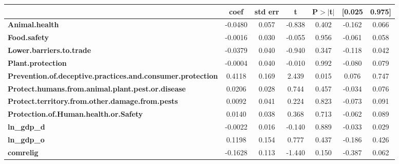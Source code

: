 \begin{center}
\begin{tabular}{lcccccc}
                                                                   & \textbf{coef} & \textbf{std err} & \textbf{t} & \textbf{P$> |$t$|$} & \textbf{[0.025} & \textbf{0.975]}  \\
\midrule
\textbf{Animal.health}                                             &      -0.0480  &        0.057     &    -0.838  &         0.402        &       -0.162    &        0.066     \\
\textbf{Food.safety}                                               &      -0.0016  &        0.030     &    -0.055  &         0.956        &       -0.061    &        0.058     \\
\textbf{Lower.barriers.to.trade}                                   &      -0.0379  &        0.040     &    -0.940  &         0.347        &       -0.118    &        0.042     \\
\textbf{Plant.protection}                                          &      -0.0004  &        0.040     &    -0.010  &         0.992        &       -0.080    &        0.079     \\
\textbf{Prevention.of.deceptive.practices.and.consumer.protection} &       0.4118  &        0.169     &     2.439  &         0.015        &        0.076    &        0.747     \\
\textbf{Protect.humans.from.animal.plant.pest.or.disease}          &       0.0206  &        0.028     &     0.744  &         0.457        &       -0.034    &        0.076     \\
\textbf{Protect.territory.from.other.damage.from.pests}            &       0.0092  &        0.041     &     0.224  &         0.823        &       -0.073    &        0.091     \\
\textbf{Protection.of.Human.health.or.Safety}                      &       0.0140  &        0.038     &     0.368  &         0.713        &       -0.062    &        0.089     \\
\textbf{ln\_gdp\_d}                                                &      -0.0022  &        0.016     &    -0.140  &         0.889        &       -0.033    &        0.029     \\
\textbf{ln\_gdp\_o}                                                &       0.1198  &        0.154     &     0.777  &         0.437        &       -0.186    &        0.426     \\
\textbf{comrelig}                                                  &      -0.1628  &        0.113     &    -1.440  &         0.150        &       -0.387    &        0.062     \\

\end{tabular}
\end{center}
